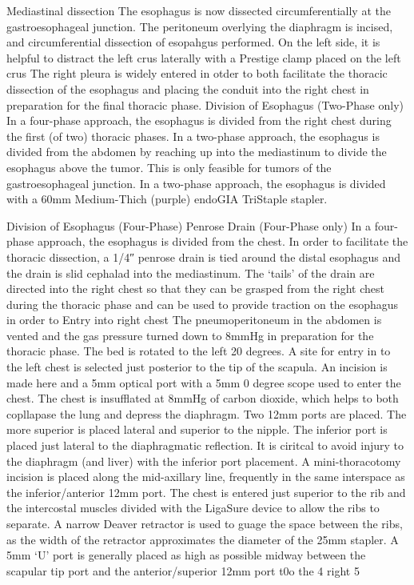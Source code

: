 \documentclass[
]{book}
\begin{document}
Mediastinal dissection
The esophagus is now dissected circumferentially at the gastroesophageal junction. The peritoneum overlying the diaphragm is incised, and circumferential dissection of esopahgus performed. On the left side, it is helpful to distract the left crus laterally with a Prestige clamp placed on the left crus The right pleura is widely entered in otder to both facilitate the thoracic dissection of the esophagus and placing the conduit into the right chest in preparation for the final thoracic phase. Division of Esophagus (Two-Phase only) In a four-phase approach, the esophagus is divided from the right chest during the first (of two) thoracic phases. In a two-phase approach, the esophagus is divided from the abdomen by reaching up into the mediastinum to divide the esophagus above the tumor. This is only feasible for tumors of the gastroesophageal junction. In a two-phase approach, the esophagus is divided with a 60mm Medium-Thich (purple) endoGIA TriStaple stapler.

Division of Esophagus (Four-Phase)
Penrose Drain (Four-Phase only) In a four-phase approach, the esophagus is divided from the chest. In order to facilitate the thoracic dissection, a 1/4″ penrose drain is tied around the distal esophagus and the drain is slid cephalad into the mediastinum. The `tails' of the drain are directed into the right chest so that they can be grasped from the right chest during the thoracic phase and can be used to provide traction on the esophagus in order to Entry into right chest The pneumoperitoneum in the abdomen is vented and the gas pressure turned down to 8mmHg in preparation for the thoracic phase. The bed is rotated to the left 20 degrees. A site for entry in to the left chest is selected just posterior to the tip of the scapula. An incision is made here and a 5mm optical port with a 5mm 0 degree scope used to enter the chest. The chest is insufflated at 8mmHg of carbon dioxide, which helps to both copllapase the lung and depress the diaphragm. Two 12mm ports are placed. The more superior is placed lateral and superior to the nipple. The inferior port is placed just lateral to the diaphragmatic reflection. It is ciritcal to avoid injury to the diaphragm (and liver) with the inferior port placement. A mini-thoracotomy incision is placed along the mid-axillary line, frequently in the same interspace as the inferior/anterior 12mm port. The chest is entered just superior to the rib and the intercostal muscles divided with the LigaSure device to allow the ribs to separate. A narrow Deaver retractor is used to guage the space between the ribs, as the width of the retractor approximates the diameter of the 25mm stapler. A 5mm `U' port is generally placed as high as possible midway between the scapular tip port and the anterior/superior 12mm port t0o the 4 right 5
\end{document}
